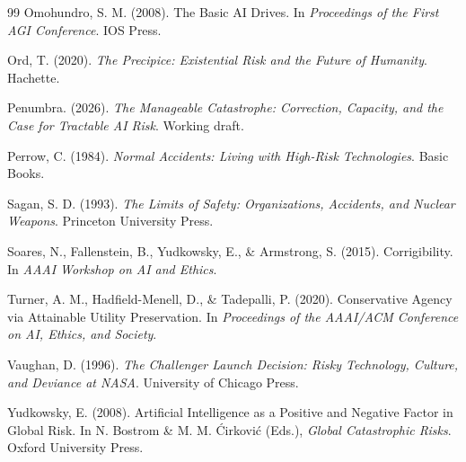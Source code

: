 \documentclass[11pt]{article}
\begin{document}
\begin{thebibliography}{99}
Omohundro, S. M. (2008). The Basic AI Drives. In \textit{Proceedings of the First AGI Conference}. IOS Press.

Ord, T. (2020). \textit{The Precipice: Existential Risk and the Future of Humanity}. Hachette.

Penumbra. (2026). \textit{The Manageable Catastrophe: Correction, Capacity, and the Case for Tractable AI Risk}. Working draft.

Perrow, C. (1984). \textit{Normal Accidents: Living with High-Risk Technologies}. Basic Books.

Sagan, S. D. (1993). \textit{The Limits of Safety: Organizations, Accidents, and Nuclear Weapons}. Princeton University Press.

Soares, N., Fallenstein, B., Yudkowsky, E., \& Armstrong, S. (2015). Corrigibility. In \textit{AAAI Workshop on AI and Ethics}.

Turner, A. M., Hadfield-Menell, D., \& Tadepalli, P. (2020). Conservative Agency via Attainable Utility Preservation. In \textit{Proceedings of the AAAI/ACM Conference on AI, Ethics, and Society}.

Vaughan, D. (1996). \textit{The Challenger Launch Decision: Risky Technology, Culture, and Deviance at NASA}. University of Chicago Press.

Yudkowsky, E. (2008). Artificial Intelligence as a Positive and Negative Factor in Global Risk. In N. Bostrom \& M. M. \'{C}irkovi\'{c} (Eds.), \textit{Global Catastrophic Risks}. Oxford University Press.

\end{thebibliography}
\end{document}
